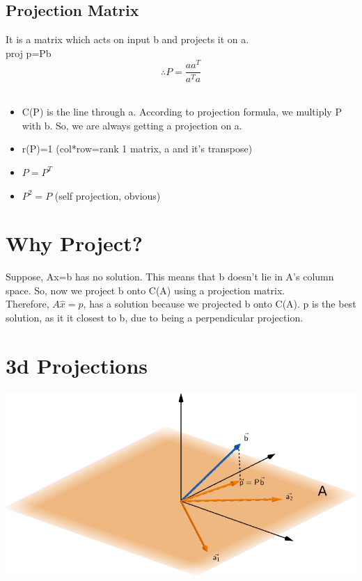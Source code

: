 \documentclass[]{article}
\begin{document}
\subsection{Projection Matrix}

It is a matrix which acts on input b and projects it on a.\\

proj p=Pb\\
\begin{equation}
	\therefore P=\frac{aa^T}{a^Ta}
\end{equation}\\

\begin{mytheorem}[title = Properties of projection matrix]
	\begin{itemize}
		\item C(P) is the line through a. According to projection formula, we multiply P with b. So, we are always getting a projection on a.
		\item r(P)=1 (col*row=rank 1 matrix, a and it's transpose)
		\item $P=P^T$
		\item $P^2=P$ (self projection, obvious)
	\end{itemize}
\end{mytheorem}

\vspace{10pt}

\section{Why Project?}

Suppose, Ax=b has no solution. This means that b doesn't lie in A's column space. So, now we project b onto C(A) using a projection matrix.\\

Therefore, $A\hat{x}=p$, has a solution because we projected b onto C(A). p is the best solution, as it it closest to b, due to being a perpendicular projection.
\vspace{10pt}

\section{3d Projections}
	\begin{center}
	\includegraphics[scale=.4]{projection2}
\end{center}
\end{document}
